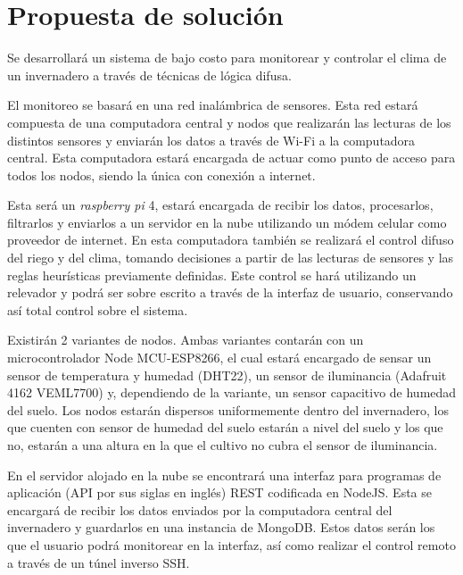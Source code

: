 \section{Propuesta de solución}

Se desarrollará un sistema de bajo costo para monitorear y controlar el clima de un invernadero a través de técnicas de lógica difusa.

El monitoreo se basará en una red inalámbrica de sensores. Esta red estará compuesta de una computadora central y nodos que realizarán las lecturas de los distintos sensores y enviarán los datos a través de Wi-Fi a la computadora central. Esta computadora estará encargada de actuar como punto de acceso para todos los nodos, siendo la única con conexión a internet. 

Esta será un \textit{raspberry pi} 4, estará encargada de recibir los datos, procesarlos, filtrarlos y enviarlos a un servidor en la nube utilizando un módem celular como proveedor de internet. En esta computadora también se realizará el control difuso del riego y del clima, tomando decisiones a partir de las lecturas de sensores y las reglas heurísticas previamente definidas. Este control se hará utilizando un relevador y podrá ser sobre escrito a través de la interfaz de usuario, conservando así total control sobre el sistema.

Existirán 2 variantes de nodos. Ambas variantes contarán con un microcontrolador Node MCU-ESP8266, el cual estará encargado de sensar un sensor de temperatura y humedad (DHT22), un sensor de iluminancia (Adafruit 4162 VEML7700) y, dependiendo de la variante, un sensor capacitivo de humedad del suelo. Los nodos estarán dispersos uniformemente dentro del invernadero, los que cuenten con sensor de humedad del suelo estarán a nivel del suelo y los que no, estarán a una altura en la que el cultivo no cubra el sensor de iluminancia.

En el servidor alojado en la nube se encontrará una interfaz para programas de aplicación (API por sus siglas en inglés) REST codificada en NodeJS. Esta se encargará de recibir los datos enviados por la computadora central del invernadero y guardarlos en una instancia de MongoDB. Estos datos serán los que el usuario podrá monitorear en la interfaz, así como realizar el control remoto a través de un túnel inverso SSH.
